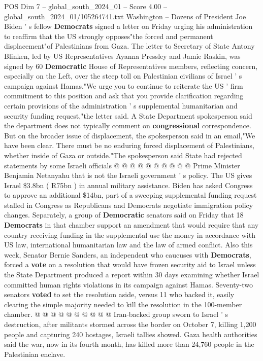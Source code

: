 \begin{textsample}{POS Dim 7 – global\_south\_2024\_01 – Score 4.00 – global\_south\_2024\_01/105264741.txt}  \label{ex:f7_pos_312}
Washington -- Dozens of President Joe Biden ' s fellow \textbf{Democrats} signed a letter on Friday urging his administration to reaffirm that the US strongly opposes"the forced and permanent displacement"of Palestinians from Gaza.
The letter to Secretary of State Antony Blinken, led by US Representatives Ayanna Pressley and Jamie Raskin, was signed by 60 \textbf{Democratic} House of Representatives members, reflecting concern, especially on the Left, over the steep toll on Palestinian civilians of Israel ' s campaign against Hamas."We urge you to continue to reiterate the US ' firm commitment to this position and ask that you provide clarification regarding certain provisions of the administration ' s supplemental humanitarian and security funding request,"the letter said.
A State Department spokesperson said the department does not typically comment on \textbf{congressional} correspondence.
But on the broader issue of displacement, the spokesperson said in an email,"We have been clear.
There must be no enduring forced displacement of Palestinians, whether inside of Gaza or outside."The spokesperson said State had rejected statements by some Israeli officials @ @ @ @ @ @ @ @ @ @ Prime Minister Benjamin Netanyahu that is not the Israeli government ' s policy.
The US gives Israel \$3.8bn ( R75bn ) in annual military assistance.
Biden has asked Congress to approve an additional \$14bn, part of a sweeping supplemental funding request stalled in Congress as Republicans and Democrats negotiate immigration policy changes.
Separately, a group of \textbf{Democratic} senators said on Friday that 18 \textbf{Democrats} in that chamber support an amendment that would require that any country receiving funding in the supplemental use the money in accordance with US law, international humanitarian law and the law of armed conflict.
Also this week, Senator Bernie Sanders, an independent who caucuses with \textbf{Democrats}, forced a \textbf{vote} on a resolution that would have frozen security aid to Israel unless the State Department produced a report within 30 days examining whether Israel committed human rights violations in its campaign against Hamas.
Seventy-two senators \textbf{voted} to set the resolution aside, versus 11 who backed it, easily clearing the simple majority needed to kill the resolution in the 100-member chamber. @ @ @ @ @ @ @ @ @ @ Iran-backed group sworn to Israel ' s destruction, after militants stormed across the border on October 7, killing 1,200 people and capturing 240 hostages, Israeli tallies showed.
Gaza health authorities said the war, now in its fourth month, has killed more than 24,760 people in the Palestinian enclave.

\end{textsample}
